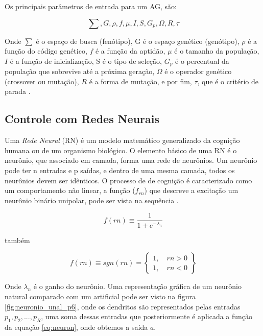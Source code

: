 
Os principais parâmetros de entrada para um AG, são:

\begin{equation}
  \sum , G, \rho, f, \mu, I, S, G_p,\Omega, R, \tau  
 \end{equation} 

Onde $\sum$ é o espaço de busca (fenótipo), G é o espaço genético (genótipo), $\rho$ é a função do código genético, $f$ é a função da aptidão, $\mu$ é o tamanho da população, $I$ é a função de inicialização, S é o tipo de seleção, $G_p$ é o percentual da população que sobrevive até a próxima geração, $\Omega$ é o operador genético (crossover ou mutação),  $R$ é a forma de mutação, e por fim, $\tau$, que é o critério de parada \cite{Unal2013}. %


\subsection{Controle com Redes Neurais}  %

Uma \textit{Rede Neural} (RN) é um modelo matemático generalizado da cognição humana ou de um organismo biológico. O elemento básico de uma RN é o neurônio, que associado em camada, forma uma rede de neurônios. Um neurônio pode ter n entradas e p saídas, e dentro de uma mesma camada, todos os neurônios devem ser idênticos. O processo de de cognição é caracterizado como um comportamento não linear, a função ($f_{rn}$) que descreve a excitação um neurônio binário unipolar,  pode ser vista na sequência \cite{Unal2013}. 

\begin{equation} \label{eq:neuron}
 f(rn) \equiv \frac{1}{1+e^{-\lambda_n}}
\end{equation}

também

\begin{equation}
 f(rn) \equiv sgn(rn) = \begin{Bmatrix}  1, \quad rn>0 \\ 1, \quad rn<0  \end{Bmatrix}
\end{equation}

Onde $\lambda_n$ é o ganho do neurônio. Uma representação gráfica de um neurônio natural comparado com um artificial pode ser visto na figura \ref{fig:neuronio_unal_p6}, onde os dendritos são representados pelas entradas $p_1, p_2, ..., p_R$, uma soma dessas entradas que posteriormente é aplicada a função da equação \ref{eq:neuron}, onde obtemos a saída $a$.

